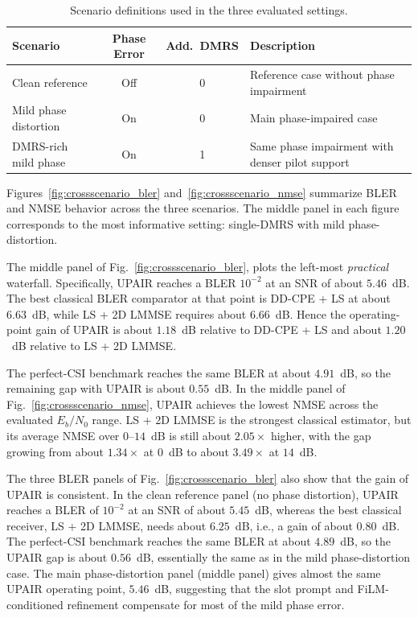 \documentclass[conference,letterpaper]{IEEEtran}
\newcommand{\snr}{E_b/N_0}
\begin{document}
	
	
	
	\begin{table}[tbp]
		\centering
		\caption{Scenario definitions used in the three evaluated  settings.}
		\label{tab:scenario_setup}
		\scriptsize
		\setlength{\tabcolsep}{2.5pt}
		\renewcommand{\arraystretch}{1.12}
		\begin{tabular}{p{} c c p{}}
			\toprule
			Scenario & Phase Error & Add.\ DMRS & Description \\
			\midrule
			Clean reference & Off & 0 & Reference case without phase impairment \\
			\midrule
			Mild phase distortion & On & 0 & Main phase-impaired case \\
			\midrule
			DMRS-rich mild phase & On & 1 & Same phase impairment with denser pilot support \\
			\bottomrule
		\end{tabular}
	\end{table}
	
	
	
	Figures~\ref{fig:crossscenario_bler} and~\ref{fig:crossscenario_nmse} summarize BLER and NMSE behavior across the three scenarios. The middle panel in each figure corresponds to the most informative setting: single-DMRS with mild phase-distortion.
	
	The middle panel of Fig.~\ref{fig:crossscenario_bler}, plots the left-most \emph{practical} waterfall. Specifically, UPAIR{} reaches a BLER $10^{-2}$ at an SNR of about $5.46$~dB. The best classical BLER comparator at that point is DD-CPE{} + LS at about $6.63$~dB, while LS + 2D LMMSE requires about $6.66$~dB. Hence the operating-point gain of UPAIR{} is about $1.18$~dB relative to DD-CPE{} + LS and about $1.20$~dB relative to LS + 2D LMMSE. 
	
	The perfect-CSI benchmark reaches the same BLER at about $4.91$~dB, so the remaining gap with UPAIR{} is about $0.55$~dB. In the middle panel of Fig.~\ref{fig:crossscenario_nmse}, UPAIR{} achieves the lowest NMSE{} across the evaluated $\snr$ range. LS + 2D LMMSE is the strongest classical estimator, but its average NMSE{} over $0$--$14$~dB is still about $2.05\times$ higher, with the gap growing from about $1.34\times$ at $0$~dB to about $3.49\times$ at $14$~dB.
	
	The three BLER panels of Fig.~\ref{fig:crossscenario_bler} also show that the gain of UPAIR{} is consistent. In the clean reference panel (no phase distortion), UPAIR{} reaches a BLER of $10^{-2}$ at an SNR of about $5.45$~dB, whereas the best classical receiver, LS + 2D LMMSE, needs about $6.25$~dB, i.e., a gain of about $0.80$~dB. The perfect-CSI benchmark reaches the same BLER at about $4.89$~dB, so the UPAIR gap is about $0.56$~dB, essentially the same as in the mild phase-distortion case. The main phase-distortion panel (middle panel) gives almost the same UPAIR{} operating point, $5.46$~dB, suggesting that the slot prompt and FiLM-conditioned refinement compensate for most of the mild phase error.
	
\end{document}
